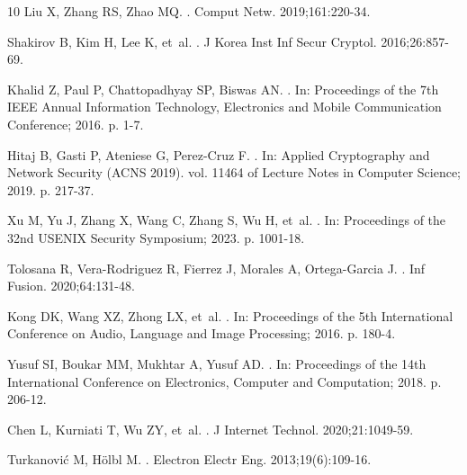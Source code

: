 \begin{thebibliography}{10}
Liu X, Zhang RS, Zhao MQ.
.
\newblock Comput Netw. 2019;161:220-34.

Shakirov B, Kim H, Lee K, et~al.
.
\newblock J Korea Inst Inf Secur Cryptol. 2016;26:857-69.

Khalid Z, Paul P, Chattopadhyay SP, Biswas AN.
.
\newblock In: Proceedings of the 7th IEEE Annual Information Technology,
  Electronics and Mobile Communication Conference; 2016. p. 1-7.

Hitaj B, Gasti P, Ateniese G, Perez-Cruz F.
.
\newblock In: Applied Cryptography and Network Security (ACNS 2019). vol. 11464
  of Lecture Notes in Computer Science; 2019. p. 217-37.

Xu M, Yu J, Zhang X, Wang C, Zhang S, Wu H, et~al.
.
\newblock In: Proceedings of the 32nd USENIX Security Symposium; 2023. p.
  1001-18.

Tolosana R, Vera-Rodriguez R, Fierrez J, Morales A, Ortega-Garcia J.
.
\newblock Inf Fusion. 2020;64:131-48.

Kong DK, Wang XZ, Zhong LX, et~al.
.
\newblock In: Proceedings of the 5th International Conference on Audio,
  Language and Image Processing; 2016. p. 180-4.

Yusuf SI, Boukar MM, Mukhtar A, Yusuf AD.
.
\newblock In: Proceedings of the 14th International Conference on Electronics,
  Computer and Computation; 2018. p. 206-12.

Chen L, Kurniati T, Wu ZY, et~al.
.
\newblock J Internet Technol. 2020;21:1049-59.

Turkanovi{\'c} M, H{\"o}lbl M.
.
\newblock Electron Electr Eng. 2013;19(6):109-16.


\end{thebibliography}
